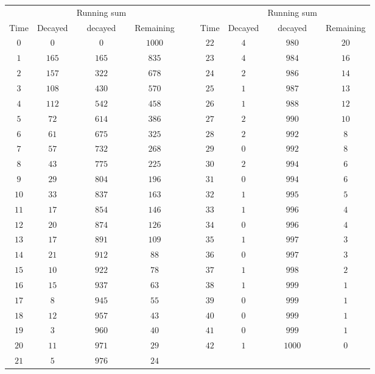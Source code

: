 \begin{tabular}{ccccrrcccc} \toprule
     &         & Running sum &           &&&      &         & Running sum &           \\
Time & Decayed & decayed     & Remaining &&& Time & Decayed & decayed     & Remaining \\\midrule
$0$  & $0$     & $0$         & $1000$    &&& $22$ & $4$     & $980$       & $20$      \\
$1$  & $165$   & $165$       & $835$     &&& $23$ & $4$     & $984$       & $16$      \\
$2$  & $157$   & $322$       & $678$     &&& $24$ & $2$     & $986$       & $14$      \\
$3$  & $108$   & $430$       & $570$     &&& $25$ & $1$     & $987$       & $13$      \\
$4$  & $112$   & $542$       & $458$     &&& $26$ & $1$     & $988$       & $12$      \\
$5$  & $72$    & $614$       & $386$     &&& $27$ & $2$     & $990$       & $10$      \\
$6$  & $61$    & $675$       & $325$     &&& $28$ & $2$     & $992$       & $8$       \\
$7$  & $57$    & $732$       & $268$     &&& $29$ & $0$     & $992$       & $8$       \\
$8$  & $43$    & $775$       & $225$     &&& $30$ & $2$     & $994$       & $6$       \\
$9$  & $29$    & $804$       & $196$     &&& $31$ & $0$     & $994$       & $6$       \\
$10$ & $33$    & $837$       & $163$     &&& $32$ & $1$     & $995$       & $5$       \\
$11$ & $17$    & $854$       & $146$     &&& $33$ & $1$     & $996$       & $4$       \\
$12$ & $20$    & $874$       & $126$     &&& $34$ & $0$     & $996$       & $4$       \\
$13$ & $17$    & $891$       & $109$     &&& $35$ & $1$     & $997$       & $3$       \\
$14$ & $21$    & $912$       & $88$      &&& $36$ & $0$     & $997$       & $3$       \\
$15$ & $10$    & $922$       & $78$      &&& $37$ & $1$     & $998$       & $2$       \\
$16$ & $15$    & $937$       & $63$      &&& $38$ & $1$     & $999$       & $1$       \\
$17$ & $8$     & $945$       & $55$      &&& $39$ & $0$     & $999$       & $1$       \\
$18$ & $12$    & $957$       & $43$      &&& $40$ & $0$     & $999$       & $1$       \\
$19$ & $3$     & $960$       & $40$      &&& $41$ & $0$     & $999$       & $1$       \\
$20$ & $11$    & $971$       & $29$      &&& $42$ & $1$     & $1000$      & $0$       \\
$21$ & $5$     & $976$       & $24$ \\\bottomrule
\end{tabular}
